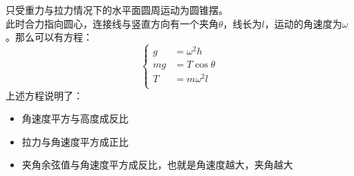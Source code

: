 \begin{casetypebox}[title={\strut\textcolor{white}{\bfseries 常见题型：圆锥摆}}]
  只受重力与拉力情况下的水平面圆周运动为圆锥摆。\\
  此时合力指向圆心，连接线与竖直方向有一个夹角$\theta$，线长为$l$，运动的角速度为$\omega$。那么可以有方程：
  \[\left\{
    \begin{aligned}
      g& =\omega^2h \\
      mg & =T\cos\theta \\
      T& =m\omega^2l\\
    \end{aligned}\right.\]
  上述方程说明了：
  \begin{itemize}
    \item 角速度平方与高度成反比
    \item 拉力与角速度平方成正比
    \item 夹角余弦值与角速度平方成反比，也就是角速度越大，夹角越大
  \end{itemize}
\end{casetypebox}

